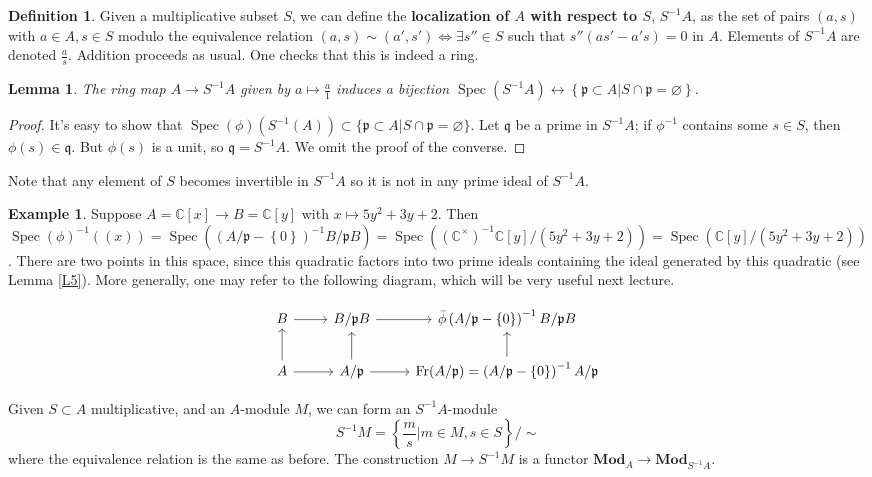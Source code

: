 \documentclass{article}
\newcommand{\C}{\mathbb{C}}
\newcommand{\fr}{\mathfrak}
\DeclareMathOperator{\Spec}{Spec}
\theoremstyle{plain}
\newtheorem{lem}[thm]{Lemma}
\theoremstyle{definition}
\newtheorem{defn}{Definition}
\newtheorem{exmp}{Example}
\theoremstyle{remark}
\begin{document}
\begin{defn}
    Given a multiplicative subset $S$, we can define the \textbf{localization of $A$ with respect to $S$}, $S^{-1}A$, as the set of pairs $(a,s)$ with $a\in A,s\in S$ modulo the equivalence relation
    $(a,s)\sim(a',s')\iff \exists s''\in S$ such that $s''(as'-a's)=0$ in $A$. Elements of $S^{-1}A$ are denoted $\frac{a}{s}$. Addition proceeds
    as usual. One checks that this is indeed a ring.
\end{defn}

\begin{lem}
\label{L7}
    The ring map $A\to S^{-1}A$ given by $a\mapsto \frac{a}{1}$ induces a bijection $\Spec(S^{-1}A)\leftrightarrow\left\{ \fr p\subset A|S\cap \fr p=\varnothing \right\}$.
\end{lem}
\begin{proof}
It's easy to show that $\Spec(\phi) (S^{-1}(A)) \subset \{ \fr p\subset A|S\cap \fr p=\varnothing \}$. Let $\fr q$ be a prime in $S^{-1}A$; if $\phi^{-1}$ contains some $s\in S$, then $\phi(s) \in \fr q$. But $\phi(s)$ is a unit, so $\fr q = S^{-1}A$. We omit the proof of the converse.
\end{proof}
Note that any element of $S$ becomes invertible in $S^{-1}A$ so it is not in any prime ideal of $S^{-1}A$. 

\begin{exmp}
\label{E3}
    Suppose $A=\C[x]\to B=\C[y]$ with $x\mapsto 5y^2+3y+2$. Then $\Spec(\phi)^{-1}\left( (x) \right)=\Spec\left( (A/\fr p-\left\{ 0 \right\})^{-1} B/\fr p B \right)=\Spec\left( (\C^\times)^{-1}\C[y]/(5y^2+3y+2) \right)=\Spec\left(\C[y]/(5y^2+3y+2) \right)$. There are two points in this space, since this quadratic factors into two prime ideals containing the ideal generated by this quadratic (see Lemma \ref{L5}). More generally, one may refer to the following diagram, which will be very useful next lecture.
\end{exmp}

\[
\begin{tikzcd}
B\arrow{r}&B/\fr pB\arrow{r} & \bar\phi\left(A/\fr p-\{0\}\right)^{-1}B/\fr pB\\
A\arrow{r}\arrow{u} & A/\fr p\arrow{r}\arrow{u}&\text{Fr}(A/\fr p)=\left(A/\fr p-\{0\}\right)^{-1}A/\fr p\arrow{u}
\end{tikzcd}
\]

Given $S\subset A$ multiplicative, and an $A$-module $M$, we can form an $S^{-1}A$-module
\[S^{-1}M=\left\{ \frac{m}{s}|m\in M,s\in S \right\}/\sim\]
where the equivalence relation is the same as before. The construction $M\to S^{-1}M$ is a functor $\mathbf{Mod}_A\to\mathbf{Mod}_{S^{-1}A}$.
\end{document}
